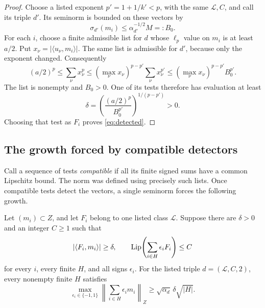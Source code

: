 \begin{proof}
Choose a listed exponent \(p'=1+1/k'<p\), with the same
\(\mathcal L,C\), and call its triple \(d'\). Its seminorm is bounded
on these vectors by
\[
                  \sigma_{d'}(m_i)\leq
                  \alpha_{d'}^{-1/2}M=:B_0.
\]
For each \(i\), choose a finite admissible list for \(d\) whose
\(\ell_p\) value on \(m_i\) is at least \(a/2\). Put
\(x_\nu=|\langle u_\nu,m_i\rangle|\). The same list is admissible
for \(d'\), because only the exponent changed. Consequently
\[
 (a/2)^p\leq\sum_\nu x_\nu^p
 \leq(\max_\nu x_\nu)^{p-p'}\sum_\nu x_\nu^{p'}
 \leq(\max_\nu x_\nu)^{p-p'}B_0^{p'}.
\]
The list is nonempty and \(B_0>0\). One of its tests therefore has
evaluation at least
\[
             \delta=\left(\frac{(a/2)^p}{B_0^{p'}}\right)^{1/(p-p')}>0.
\]
Choosing that test as \(F_i\) proves \eqref{eq:detected}.
\end{proof}

\subsection{The growth forced by compatible detectors}

Call a sequence of tests \emph{compatible} if all its finite signed
sums have a common Lipschitz bound. The norm was defined using precisely
such lists. Once compatible tests detect the vectors, a single
seminorm forces the following growth.

\begin{lemma}\label{lem:detector-growth}
Let \((m_i)\subset Z\), and let \(F_i\) belong to one listed class
\(\mathcal L\). Suppose there are \(\delta>0\) and an integer
\(C\geq1\) such that
\[
 |\langle F_i,m_i\rangle|\geq\delta,
 \qquad
 \operatorname{Lip}\!\left(\sum_{i\in H}\epsilon_iF_i\right)\leq C
\]
for every \(i\), every finite \(H\), and all signs \(\epsilon_i\).
For the listed triple \(d=(\mathcal L,C,2)\), every nonempty finite
\(H\) satisfies
\begin{equation}
 \max_{\epsilon_i\in\{-1,1\}}
 \left\|\sum_{i\in H}\epsilon_i m_i\right\|_Z
 \geq\sqrt{\alpha_d}\,\delta\sqrt{|H|}.
 \label{eq:detector-growth}
\end{equation}
\end{lemma}

